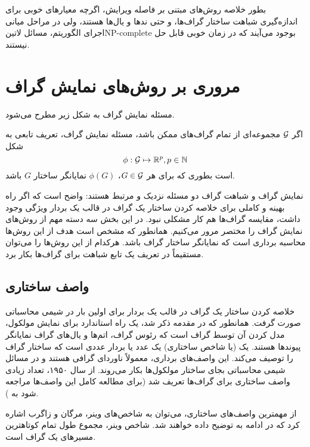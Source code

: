 بطور خلاصه روش‌های مبتنی بر فاصله ویرایش، اگرچه معیارهای خوبی برای اندازه‌گیری شباهت ساختار گراف‌ها، و حتی ند‌ها و یال‌ها هستند، ولی در مراحل میانی اجرای الگوریتم، مسائل ‌لاتین{NP-complete} بوجود می‌آیند که در زمان خوبی قابل حل نیستند.

\section{مروری بر روش‌های نمایش گراف}\label{sec:graph_representation}
مسئله نمایش گراف به شکل زیر مطرح می‌شود.
\begin{definition}
اگر $\mathcal{G}$ مجموعه‌ای از تمام گراف‌های ممکن باشد، مسئله نمایش گراف‌، تعریف تابعی به شکل
\begin{equation*}
\phi:\mathcal{G} \mapsto \mathbb{R}^p, p \in \mathbb{N}
\end{equation*}
است بطوری که برای هر $G \in \mathcal{G}$،
 $\phi(G)$
  نمایانگر ساختار $G$ باشد.
\end{definition}

نمایش گراف و شباهت گراف دو مسئله نزدیک و مرتبط هستند: واضح است که اگر راه بهینه و کاملی برای خلاصه کردن ساختار یک گراف در قالب یک بردار ویژگی وجود داشت، مقایسه گراف‌ها هم کار مشکلی نبود. در این بخش سه دسته مهم از روش‌های نمایش گراف را مختصر مرور می‌کنیم. همانطور که مشخص است هدف از این روش‌ها محاسبه برداری است که نمایانگر ساختار گراف باشد. هرکدام از این روش‌ها را می‌توان مستقیماً در تعریف یک تابع شباهت برای گراف‌ها بکار برد.

\subsection{واصف ساختاری}
خلاصه کردن ساختار یک گراف در قالب یک بردار برای اولین بار در شیمی محاسباتی صورت گرفت‌. همانطور که در مقدمه ذکر شد، یک راه استاندارد برای نمایش مولکول، مدل کردن آن توسط گراف است که رئوس گراف، اتم‌ها و یال‌های گراف نمایانگر پیوندها هستند. یک (یا شاخص ساختاری) یک عدد یا بردار عددی است که ساختار گراف را توصیف می‌کند. این واصف‌های برداری، معمولاً  ناوردای گرافی هستند و در مسائل شیمی محاسباتی بجای ساختار مولکول‌ها بکار می‌روند.  از سال ۱۹۵۰، تعداد زیادی واصف ساختاری برای گراف‌ها تعریف شد (برای مطالعه کامل این واصف‌ها مراجعه شود به ).

از مهمترین واصف‌های ساختاری، می‌توان به شاخص‌های وینر، مرگان و زاگرب اشاره کرد که در ادامه به توضیح داده خواهند شد. شاخص وینر، مجموع طول تمام کوتاهترین مسیرهای یک گراف است.

